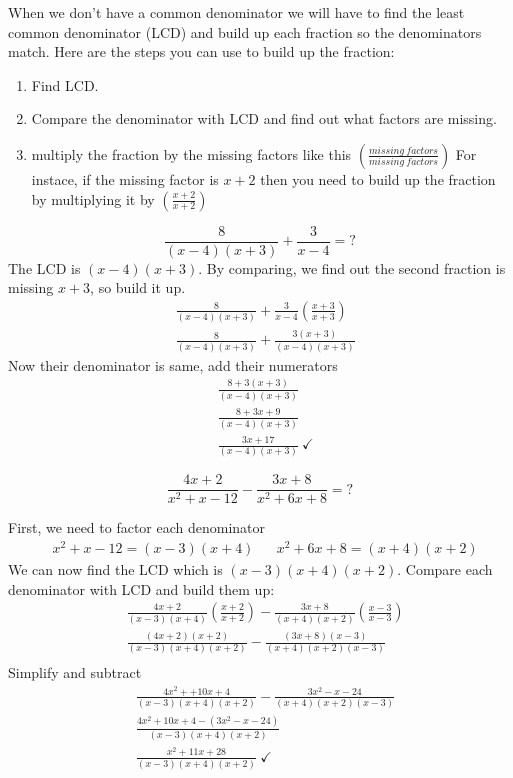 When we don’t have a common denominator we will have to find the least
common denominator (LCD) and build up each fraction so the denominators
match. Here are the steps you can use to build up the fraction:
\begin{enumerate}[label=\protect\circled{\arabic*}]
\item Find LCD.
\item Compare the denominator with LCD and find out what factors are missing.
\item multiply the fraction by the missing factors like this 
	$\displaystyle \left(\frac{  missing\ factors}{missing\ factors}\right)  $
        For instace, if the missing factor is $x+2$ then you need to build up the
        fraction by multiplying it by 
        $\displaystyle \left(\frac{x+2}{x+2} \right)$
\end{enumerate}
\begin{exa}
\[
		\frac{8}{(x-4)(x+3)}+\frac{3}{x-4} =?
\]
The LCD is $(x-4)(x+3)$. By comparing, we find out the second fraction is missing
$x+3$, so build it up.
\begin{align*}
		&\frac{8}{(x-4)(x+3)}+\frac{3}{x-4}\left(\frac{x+3}{x+3} \right)\\
        &\frac{8}{(x-4)(x+3)}+\frac{3(x+3)}{(x-4)(x+3)}
\end{align*}
Now their denominator is same, add their numerators
\begin{align*}
        &\frac{8+3(x+3)}{(x-4)(x+3)}\\
        &\frac{8+3x+9}{(x-4)(x+3)}\\
        &\frac{3x+17}{(x-4)(x+3)}\ \checkmark
\end{align*}
\end{exa}
\begin{exa}
	\[
		\frac{4x+2}{x^2+x-12} - \frac{3x+8}{x^2+6x+8} =?
\]
\end{exa}
First, we need to factor each denominator
\begin{align*}
		&x^2+x-12 =(x-3)(x+4)	&	&x^2+6x+8=(x+4)(x+2)
\end{align*}
We can now find the LCD which is $(x-3)(x+4)(x+2)$. Compare each denominator with
LCD and build them up:
\begin{align*}
		&\frac{4x+2}{(x-3)(x+4)}\left(\frac{x+2}{x+2}\right) -
        	\frac{3x+8}{(x+4)(x+2)}\left( \frac{x-3}{x-3}\right)\\
        &\frac{(4x+2)(x+2)}{(x-3)(x+4)(x+2)} -
        	\frac{(3x+8)(x-3)}{(x+4)(x+2)(x-3)}\\
\end{align*}
Simplify and subtract
\begin{align*}
        &\frac{ 4x^2++10x+4 }{(x-3)(x+4)(x+2)} -
        	\frac{ 3x^2-x-24 }{(x+4)(x+2)(x-3)}\\
        &\frac{ 4x^2+10x+4-(3x^2-x-24) }{(x-3)(x+4)(x+2)}\\
        &\frac{ x^2+11x+28 }{(x-3)(x+4)(x+2)}\  \checkmark
\end{align*}